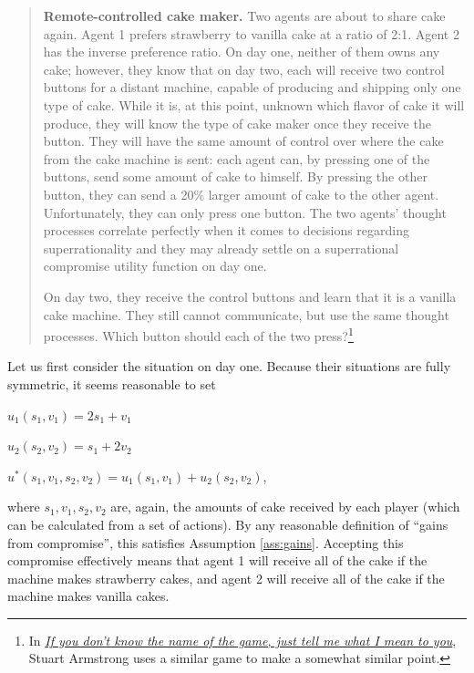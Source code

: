 \begin{quote}
\textbf{Remote-controlled cake maker.} Two agents are about to share
cake again. Agent 1 prefers strawberry to vanilla cake at a ratio of
2:1. Agent 2 has the inverse preference ratio. On day one, neither of
them owns any cake; however, they know that on day two, each will
receive two control buttons for a distant machine, capable of producing
and shipping only one type of cake. While it is, at this point, unknown
which flavor of cake it will produce, they will know the type of cake
maker once they receive the button. They will have the same amount of
control over where the cake from the cake machine is sent: each agent
can, by pressing one of the buttons, send some amount of cake to
himself. By pressing the other button, they can send a 20\% larger
amount of cake to the other agent. Unfortunately, they can only press
one button. The two agents' thought processes correlate perfectly when
it comes to decisions regarding superrationality and they may already
settle on a superrational compromise utility function on day one.

On day two, they receive the control buttons and learn that it is a
vanilla cake machine. They still cannot communicate, but use the same
thought processes. Which button should each of the two press?\footnote{In
  \href{http://lesswrong.com/lw/2xb/if_you_dont_know_the_name_of_the_game_just_tell/}{\emph{If
  you don't know the name of the game, just tell me what I mean to
  you}}, Stuart Armstrong uses a similar game to make a somewhat
  similar point.}
\end{quote}

Let us first consider the situation on day one. Because their situations
are fully symmetric, it seems reasonable to set

\(u_{1}(s_{1},v_{1}) = 2s_{1} + v_{1}\)

\(u_{2}(s_{2},v_{2}) = s_{1} + {2v}_{2}\)

\(u^{*}(s_{1},v_{1},s_{2},v_{2}) = u_{1}(s_{1},v_{1}) + u_{2}(s_{2},v_{2})\),

where \(s_{1},v_{1},s_{2},v_{2}\) are, again, the amounts of cake
received by each player (which can be calculated from a set of actions).
By any reasonable definition of ``gains from compromise'', this
satisfies Assumption \ref{ass:gains}. Accepting this compromise effectively means that
agent 1 will receive all of the cake if the machine makes strawberry
cakes, and agent 2 will receive all of the cake if the machine makes
vanilla cakes.

